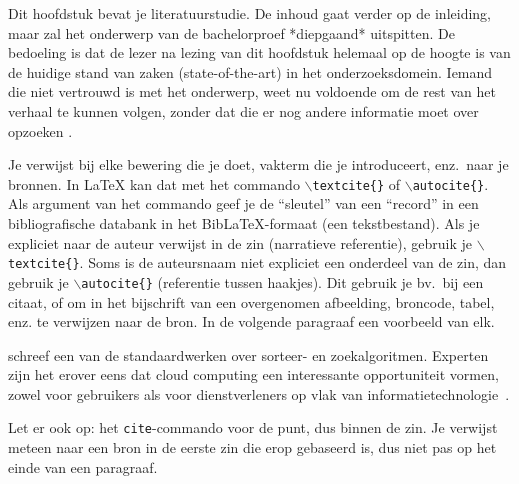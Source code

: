 Dit hoofdstuk bevat je literatuurstudie. De inhoud gaat verder op de inleiding, maar zal het onderwerp van de bachelorproef *diepgaand* uitspitten. De bedoeling is dat de lezer na lezing van dit hoofdstuk helemaal op de hoogte is van de huidige stand van zaken (state-of-the-art) in het onderzoeksdomein. Iemand die niet vertrouwd is met het onderwerp, weet nu voldoende om de rest van het verhaal te kunnen volgen, zonder dat die er nog andere informatie moet over opzoeken \autocite{Pollefliet2011}.

Je verwijst bij elke bewering die je doet, vakterm die je introduceert, enz.\ naar je bronnen. In \LaTeX{} kan dat met het commando \texttt{$\backslash${textcite\{\}}} of \texttt{$\backslash${autocite\{\}}}. Als argument van het commando geef je de ``sleutel'' van een ``record'' in een bibliografische databank in het Bib\LaTeX{}-formaat (een tekstbestand). Als je expliciet naar de auteur verwijst in de zin (narratieve referentie), gebruik je \texttt{$\backslash${}textcite\{\}}. Soms is de auteursnaam niet expliciet een onderdeel van de zin, dan gebruik je \texttt{$\backslash${}autocite\{\}} (referentie tussen haakjes). Dit gebruik je bv.~bij een citaat, of om in het bijschrift van een overgenomen afbeelding, broncode, tabel, enz. te verwijzen naar de bron. In de volgende paragraaf een voorbeeld van elk.

\textcite{Knuth1998} schreef een van de standaardwerken over sorteer- en zoekalgoritmen. Experten zijn het erover eens dat cloud computing een interessante opportuniteit vormen, zowel voor gebruikers als voor dienstverleners op vlak van informatietechnologie~\autocite{Creeger2009}.

Let er ook op: het \texttt{cite}-commando voor de punt, dus binnen de zin. Je verwijst meteen naar een bron in de eerste zin die erop gebaseerd is, dus niet pas op het einde van een paragraaf.

\lipsum[7-20]
